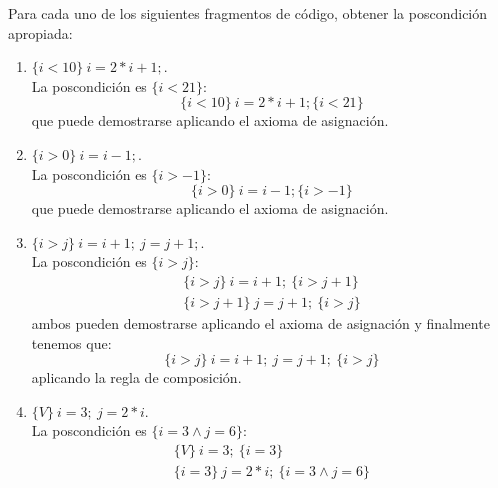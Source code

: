 \begin{ejercicio}
    Para cada uno de los siguientes fragmentos de código, obtener la poscondición apropiada:
    \begin{enumerate}[label=(\alph*)]
        \item $\{i<10\}\ i=2\ast i+1;$.\\
            La poscondición es $\{i<21\}$:
            \begin{equation*}
                \{i<10\}\ i=2\ast i+1; \{i<21\}
            \end{equation*}
            que puede demostrarse aplicando el axioma de asignación.
        \item $\{i>0\}\ i=i-1;$.\\
            La poscondición es $\{i>-1\}$:
            \begin{equation*}
                \{i>0\}\ i=i-1; \{i>-1\}
            \end{equation*}
            que puede demostrarse aplicando el axioma de asignación.
        \item $\{i>j\}\ i=i+1;\ j=j+1;$.\\
            La poscondición es $\{i>j\}$:
            \begin{gather*}
                \{i>j\}\ i=i+1;\ \{i>j+1\} \\
                \{i>j+1\}\ j=j+1;\ \{i>j\}
            \end{gather*}
            ambos pueden demostrarse aplicando el axioma de asignación y finalmente tenemos que:
            \begin{equation*}
                \{i>j\}\ i=i+1;\ j=j+1;\ \{i>j\}
            \end{equation*}
            aplicando la regla de composición.
        \item $\{V\}\ i=3;\ j=2\ast i$.\\
            La poscondición es $\{i=3 \land j=6\}$:
            \begin{gather*}
                \{V\}\ i=3;\ \{i=3\} \\
                \{i=3\}\ j=2\ast i;\ \{i=3 \land j = 6\}
            \end{gather*}
    \end{enumerate}
\end{ejercicio}

